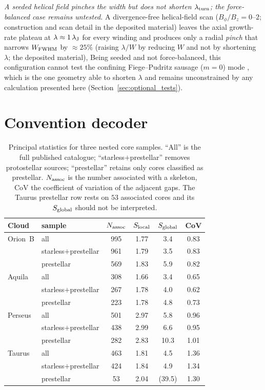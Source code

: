\documentclass[usenatbib,twoside,twocolumn]{mnras}
\begin{document}
\emph{A seeded helical field pinches the width but does not shorten $\lambda_{\rm turn}$; the force-balanced case remains untested.} A divergence-free helical-field scan ($B_\phi/B_z=0$--$2$; construction and scan detail in the deposited material) leaves the axial growth-rate plateau at $\lambda\approx1\,\lambda_{\rm J}$ for every winding and produces only a radial \emph{pinch} that narrows $W_{\rm FWHM}$ by $\approx25\%$ (raising $\lambda/W$ by reducing $W$ and not by shortening $\lambda$; the deposited material), Being seeded and not force-balanced, this configuration cannot test the confining Fiege--Pudritz sausage ($m=0$) mode \citep{Fiege2000}, which is the one geometry able to shorten $\lambda$ and remains unconstrained by any calculation presented here (Section~\ref{sec:optional_tests}).







\section{Convention decoder}

\begin{table}
\caption{Principal statistics for three nested core samples. ``All'' is the full published catalogue; ``starless$+$prestellar'' removes protostellar sources; ``prestellar'' retains only cores classified as prestellar. $N_{\rm assoc}$ is the number associated with a skeleton, CoV the coefficient of variation of the adjacent gaps. The Taurus prestellar row rests on $53$ associated cores and its $S_{\rm global}$ should not be interpreted.}
\label{tab:popsplit}
\footnotesize
\setlength{\tabcolsep}{4pt}
\begin{tabular}{llcccc}
\toprule
Cloud & sample & $N_{\rm assoc}$ & $S_{\rm local}$ & $S_{\rm global}$ & CoV \\
\midrule
Orion~B & all                  & 995 & 1.77 & 3.4 & 0.83 \\
        & starless$+$prestellar& 961 & 1.79 & 3.5 & 0.83 \\
        & prestellar           & 569 & 1.83 & 5.9 & 0.82 \\
\midrule
Aquila  & all                  & 308 & 1.66 & 3.4 & 0.65 \\
        & starless$+$prestellar& 267 & 1.78 & 4.0 & 0.62 \\
        & prestellar           & 223 & 1.78 & 4.8 & 0.73 \\
\midrule
Perseus & all                  & 501 & 2.97 & 5.8 & 0.96 \\
        & starless$+$prestellar& 438 & 2.99 & 6.6 & 0.95 \\
        & prestellar           & 282 & 2.83 & 10.3 & 1.01 \\
\midrule
Taurus  & all                  & 463 & 1.81 & 4.5 & 1.36 \\
        & starless$+$prestellar& 424 & 1.84 & 4.9 & 1.34 \\
        & prestellar           &  53 & 2.04 & (39.5) & 1.30 \\
\bottomrule
\end{tabular}
\end{table}
\end{document}
